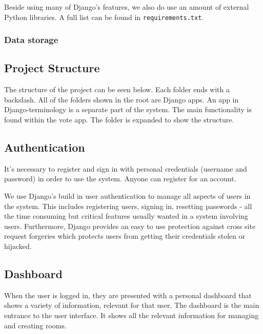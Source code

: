 Beside using many of Django's features, we also do use an amount of external Python libraries. A full list can be found in \texttt{requirements.txt}.

\subsubsection{Data storage}

\subsection{Project Structure}
The structure of the project can be seen below. Each folder ends with a backslash. All of the folders shown in the root are Django apps. An app in Django-terminology is a separate part of the system. The main functionality is found within the vote app. The folder is expanded to show the structure.



\subsection{Authentication}
It's necessary to register and sign in with personal credentials (username and password) in order to use the system. Anyone can register for an account. 

We use Django's build in user authentication to manage all aspects of users in the system. This includes registering users, signing in, resetting passwords - all the time consuming but critical features usually wanted in a system involving users. Furthermore, Django provides an easy to use protection against cross site request forgeries which protects users from getting their credentials stolen or hijacked.

\subsection{Dashboard}
When the user is logged in, they are presented with a personal dashboard that shows a variety of information, relevant for that user.
The dashboard is the main entrance to the user interface. It shows all the relevant information for managing and creating rooms. 

